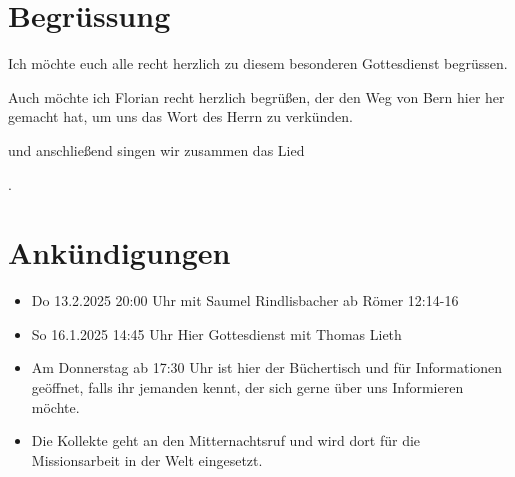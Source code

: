 
\section{Begrüssung}

Ich möchte euch alle recht herzlich zu diesem besonderen Gottesdienst begrüssen.

Auch möchte ich Florian recht herzlich begrüßen, der den Weg von Bern hier her gemacht hat, um uns das Wort des Herrn zu verkünden. 

\noindent
\beten{} und anschließend singen wir zusammen das Lied

\noindent
{}.

\section{Ankündigungen}
\begin{itemize}
    \item {} Do 13.2.2025 20:00 Uhr mit Saumel Rindlisbacher  ab Römer 12:14-16
    \item {} So 16.1.2025 14:45 Uhr Hier Gottesdienst mit Thomas Lieth
    \item {} Am Donnerstag ab 17:30 Uhr ist hier der Büchertisch und für Informationen geöffnet, falls ihr jemanden kennt, der sich gerne über uns Informieren möchte.
    \item {} Die Kollekte geht an den Mitternachtsruf und wird dort für die Missionsarbeit in der Welt eingesetzt.
\end{itemize}

